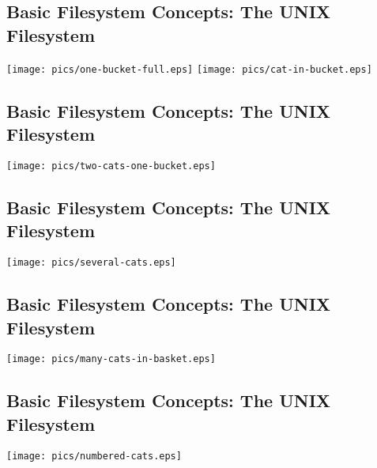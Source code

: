 \documentclass[xga]{xdvislides}
\begin{document}
\subsection{Basic Filesystem Concepts: The UNIX Filesystem}
\vspace*{\fill}
\begin{center}
\texttt{[image: pics/one-bucket-full.eps]}
\hspace*{5mm}
\texttt{[image: pics/cat-in-bucket.eps]}
\end{center}
\vspace*{\fill}

\subsection{Basic Filesystem Concepts: The UNIX Filesystem}
\vspace*{\fill}
\begin{center}
\texttt{[image: pics/two-cats-one-bucket.eps]} \\
\end{center}
\vspace*{\fill}

\subsection{Basic Filesystem Concepts: The UNIX Filesystem}
\begin{center}
\texttt{[image: pics/several-cats.eps]} \\
\end{center}

\subsection{Basic Filesystem Concepts: The UNIX Filesystem}
\vspace*{\fill}
\begin{center}
\texttt{[image: pics/many-cats-in-basket.eps]} \\
\end{center}
\vspace*{\fill}

\subsection{Basic Filesystem Concepts: The UNIX Filesystem}
\vspace*{\fill}
\begin{center}
\texttt{[image: pics/numbered-cats.eps]} \\
\end{center}
\vspace*{\fill}
\end{document}

